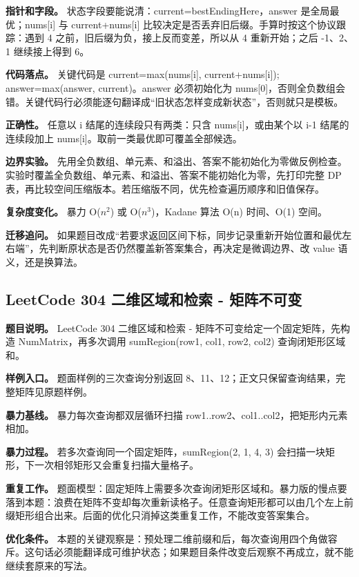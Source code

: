 \textbf{指针和字段。} 状态字段要能说清：current=bestEndingHere，answer 是全局最优；nums[i] 与 current+nums[i] 比较决定是否丢弃旧后缀。手算时按这个协议跟踪：遇到 4 之前，旧后缀为负，接上反而变差，所以从 4 重新开始；之后 -1、2、1 继续接上得到 6。

\textbf{代码落点。} 关键代码是 current=max(nums[i], current+nums[i]); answer=max(answer, current)。answer 必须初始化为 nums[0]，否则全负数组会错。关键代码行必须能逐句翻译成“旧状态怎样变成新状态”，否则就只是模板。

\textbf{正确性。} 任意以 i 结尾的连续段只有两类：只含 nums[i]，或由某个以 i-1 结尾的连续段加上 nums[i]。取前一类最优即可覆盖全部候选。

\textbf{边界实验。} 先用全负数组、单元素、和溢出、答案不能初始化为零做反例检查。实验时覆盖全负数组、单元素、和溢出、答案不能初始化为零，先打印完整 DP 表，再比较空间压缩版本。若压缩版不同，优先检查遍历顺序和旧值保存。

\textbf{复杂度变化。} 暴力 O(\ensuremath{n^{2}}) 或 O(\ensuremath{n^{3}})，Kadane 算法 O(n) 时间、O(1) 空间。

\textbf{迁移追问。} 如果题目改成“若要求返回区间下标，同步记录重新开始位置和最优左右端”，先判断原状态是否仍然覆盖新答案集合，再决定是微调边界、改 value 语义，还是换算法。

\subsection{LeetCode 304 二维区域和检索 - 矩阵不可变}

\textbf{题目说明。} LeetCode 304 二维区域和检索 - 矩阵不可变给定一个固定矩阵，先构造 NumMatrix，再多次调用 sumRegion(row1, col1, row2, col2) 查询闭矩形区域和。

\textbf{样例入口。} 题面样例的三次查询分别返回 8、11、12；正文只保留查询结果，完整矩阵见原题样例。

\textbf{暴力基线。} 暴力每次查询都双层循环扫描 row1..row2、col1..col2，把矩形内元素相加。

\textbf{暴力过程。} 若多次查询同一个固定矩阵，sumRegion(2, 1, 4, 3) 会扫描一块矩形，下一次相邻矩形又会重复扫描大量格子。

\textbf{重复工作。} 题面模型：固定矩阵上需要多次查询闭矩形区域和。暴力版的慢点要落到本题：浪费在矩阵不变却每次重新读格子。任意查询矩形都可以由几个左上前缀矩形组合出来。后面的优化只消掉这类重复工作，不能改变答案集合。

\textbf{优化条件。} 本题的关键观察是：预处理二维前缀和后，每次查询用四个角做容斥。这句话必须能翻译成可维护状态；如果题目条件改变后观察不再成立，就不能继续套原来的写法。

